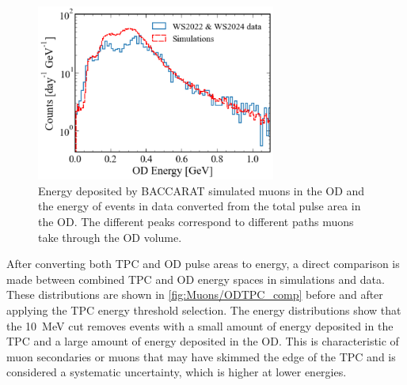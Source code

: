 \begin{figure}[h!]
    \centering
    \includegraphics[width=0.7\textwidth]{figures/Muons/OD_comparison.pdf}
    \caption[Energy deposited by BACCARAT simulated muons in the OD and the energy of events in data converted from the total pulse area in the OD.]{Energy deposited by BACCARAT simulated muons in the OD and the energy of events in data converted from the total pulse area in the OD. The different peaks correspond to different paths muons take through the OD volume.}
    \label{fig:Muons/OD_comp}
\end{figure}
After converting both TPC and OD pulse areas to energy, a direct comparison is made between combined TPC and OD energy spaces in simulations and data. These distributions are shown in \autoref{fig:Muons/ODTPC_comp} before and after applying the TPC energy threshold selection.
The energy distributions show that the 10~MeV cut removes events with a small amount of energy deposited in the TPC and a large amount of energy deposited in the OD. This is characteristic of muon secondaries or muons that may have skimmed the edge of the TPC and is considered a systematic uncertainty, which is higher at lower energies.
